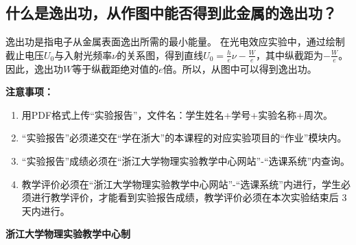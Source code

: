 \documentclass[10pt,a4paper]{ctexart}
\newcommand{\sihao}{\fontsize{14pt}{18pt}\selectfont}
\newcommand{\xiaosi}{\fontsize{12pt}{16pt}\selectfont}
\begin{document}
    \subsection{什么是逸出功，从作图中能否得到此金属的逸出功？}
      逸出功是指电子从金属表面逸出所需的最小能量。
      在光电效应实验中，通过绘制截止电压$U_0$与入射光频率$\nu$的关系图，得到直线$U_0 = \frac{h}{e}\nu - \frac{W}{e}$，其中纵截距为$-\frac{W}{e}$。
      因此，逸出功$W$等于纵截距绝对值的$e$倍。所以，从图中可以得到逸出功。

\newpage

\sihao\textbf{注意事项：}
\xiaosi
\begin{enumerate}
    \item 用PDF格式上传“实验报告”，文件名：学生姓名+学号+实验名称+周次。
    \item  “实验报告”必须递交在“学在浙大”的本课程的对应实验项目的“作业”模块内。
    \item  “实验报告”成绩必须在“浙江大学物理实验教学中心网站”-“选课系统”内查询。
    \item 教学评价必须在“浙江大学物理实验教学中心网站”-“选课系统”内进行，学生必须进行教学评价，才能看到实验报告成绩，教学评价必须在本次实验结束后 3 天内进行。
\end{enumerate}

\vspace{1cm}
\xiaosi\centering \textbf{浙江大学物理实验教学中心制}
\end{document}
